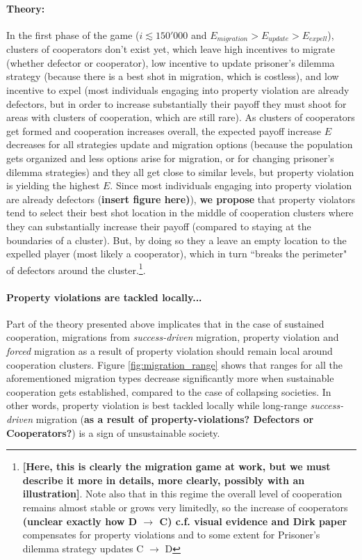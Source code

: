 \paragraph{Theory:} In the first phase of the game ($i \lesssim 150'000$ and $E_{migration} > E_{update} > E_{expell}$), clusters of cooperators don't exist yet, which leave high incentives to migrate (whether defector or cooperator), low incentive to update prisoner's dilemma strategy (because there is a best shot in migration, which is costless), and low incentive to expel (most individuals engaging into property violation are already defectors, but in order to increase substantially their payoff they must shoot for areas with clusters of cooperation, which are still rare). As clusters of cooperators get formed and cooperation increases overall, the expected payoff increase $E$ decreases for all strategies update and migration options (because the population gets organized and less options arise for migration, or for changing prisoner's dilemma strategies) and they all get close to similar levels, but property violation is yielding the highest $E$. Since most individuals engaging into property violation are already defectors ({\bf insert figure here)}), {\bf we propose} that property violators tend to select their best shot location in the middle of cooperation clusters where they can substantially increase their payoff (compared to staying at the boundaries of a cluster). But, by doing so they a leave an empty location to the expelled player (most likely a cooperator), which in turn ``breaks the perimeter" of defectors around the cluster.\footnote{ {\bf [Here, this is clearly the migration game at work, but we must describe it more in details, more clearly, possibly with an illustration]}. Note also that in this regime the overall level of cooperation remains almost stable or grows very limitedly, so the increase of cooperators {\bf (unclear exactly how D $\rightarrow$ C) c.f. visual evidence and Dirk paper} compensates for property violations and to some extent for Prisoner's dilemma strategy updates C $\rightarrow$ D}.

\paragraph{Property violations are tackled locally...}
Part of the theory presented above implicates that in the case of sustained cooperation, migrations from {\it success-driven} migration, property violation and {\it forced} migration as a result of property violation should remain local around cooperation clusters. Figure \ref{fig:migration_range} shows that ranges for all the aforementioned migration types decrease significantly more when sustainable cooperation gets established, compared to the case of collapsing societies. In other words, property violation is best tackled locally while long-range {\it success-driven} migration ({\bf as a result of property-violations? Defectors or Cooperators?}) is a sign of unsustainable society.

